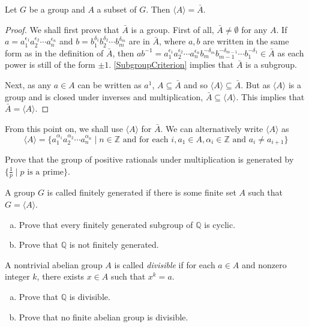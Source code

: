 \begin{theorem}
    Let $G$ be a group and $A$ a subset of $G$. Then $\langle A\rangle = \bar A$.
\end{theorem}
\begin{proof}
We shall first prove that $\bar A$ is a group. First of all, $\bar A\neq\emptyset$ for any $A$. If $a=a_1^{\epsilon_1}a_2^{\epsilon_2}\cdots a_n^{\epsilon_n}$ and $b=b_1^{\delta_1}b_2^{\delta_2}\cdots b_m^{\delta_m}$ are in $\bar A$, where $a,b$ are written in the same form as in the definition of $\bar A$, then $ab^{-1}=a_1^{\epsilon_1}a_2^{\epsilon_2}\cdots a_n^{\epsilon_n}b_m^{-\delta_m}b_{m-1}^{-\delta_{m-1}}\cdots b_1^{-\delta_1}\in \bar A$ as each power is still of the form $\pm 1$. \ref{SubgroupCriterion} implies that $\bar{A}$ is a subgroup.

Next, as any $a\in A$ can be written as $a^1$, $A\subseteq \bar A$ and so $\langle A\rangle\subseteq\bar A$. But as $\langle A\rangle$ is a group and is closed under inverses and multiplication, $\bar A\subseteq\langle A\rangle$. This implies that $\bar A=\langle A\rangle$.
\end{proof}

From this point on, we shall use $\langle A\rangle$ for $\bar A$. We can alternatively write $\langle A\rangle$ as
$$\langle A\rangle=\{a_1^{\alpha_1}a_2^{\alpha_2}\cdots a_n^{\alpha_n}\mid n\in\mathbb{Z}\text{ and for each }i, a_1\in A, \alpha_i\in\mathbb{Z}\text{ and }a_i\neq a_{i+1}\}$$

\begin{exercise}
    Prove that the group of positive rationals under multiplication is generated by $\{\frac 1p\mid p \text{ is a prime}\}$.
\end{exercise}

\begin{exercise}
    A group $G$ is called finitely generated if there is some finite set $A$ such that $G=\langle A\rangle$.
    \begin{enumerate}[(a)]
        \item Prove that every finitely generated subgroup of $\mathbb{Q}$ is cyclic.
        \item Prove that $\mathbb{Q}$ is not finitely generated.
    \end{enumerate}
\end{exercise}

\begin{exercise}
    A nontrivial abelian group $A$ is called \textit{divisible} if for each $a\in A$ and nonzero integer $k$, there exists $x\in A$ such that $x^k=a$.
    \begin{enumerate}[(a)]
        \item Prove that $\mathbb{Q}$ is divisible.
        \item Prove that no finite abelian group is divisible.
    \end{enumerate}
\end{exercise}

\clearpage